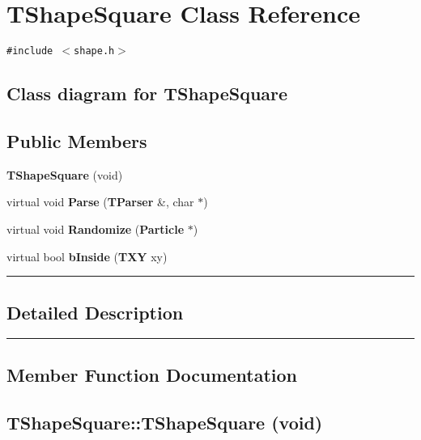 \section{TShapeSquare  Class Reference}
\label{TShapeSquare}


{\tt \#include $<$shape.h$>$}

\subsection*{Class diagram for TShapeSquare}
\begin{figure}[H]
\begin{center}
\leavevmode
\setlength{\epsfysize}{2cm}
\end{center}
\end{figure}
\subsection*{Public Members}
\begin{CompactItemize}
\item 
{\bf TShape\-Square} (void)
\item 
virtual void {\bf Parse} ({\bf TParser} \&, char $\ast$)
\item 
virtual void {\bf Randomize} ({\bf Particle} $\ast$)
\item 
virtual bool {\bf b\-Inside} ({\bf TXY} xy)
\end{CompactItemize}
\vspace{0.4cm}\hrule\vspace{0.2cm}
\subsection*{Detailed Description}
\vspace{0.4cm}\hrule\vspace{0.2cm}
\subsection*{Member Function Documentation}
\label{TShapeSquare_a0}
\subsection{\setlength{\rightskip}{0pt plus 5cm}TShape\-Square::TShape\-Square (void)}

